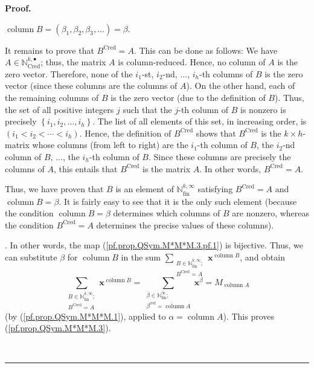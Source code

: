 \documentclass[numbers=enddot,12pt,final,onecolumn,notitlepage,abstracton]{scrartcl}%
\theoremstyle{definition}
\newenvironment{proof}[1][Proof]{\noindent\textbf{#1.} }{\ \rule{0.5em}{0.5em}}
\let\sumnonlimits\sum
\renewcommand{\sum}{\sumnonlimits\limits}
\begin{document}
\begin{proof}
{$\operatorname*{column}B=\left(  \beta_{1},\beta_{2},\beta_{3},\ldots\right)
=\beta$.
\par
It remains to prove that $B^{\operatorname*{Cred}}=A$. This can be done as
follows: We have $A\in\mathbb{N}_{\operatorname*{Cred}}^{k,\bullet}$; thus,
the matrix $A$ is column-reduced. Hence, no column of $A$ is the zero vector.
Therefore, none of the $i_{1}$-st, $i_{2}$-nd, $\ldots$, $i_{h}$-th columns of
$B$ is the zero vector (since these columns are the columns of $A$). On the
other hand, each of the remaining columns of $B$ is the zero vector (due to
the definition of $B$). Thus, the set of all positive integers $j$ such that
the $j$-th column of $B$ is nonzero is precisely $\left\{  i_{1},i_{2}%
,\ldots,i_{h}\right\}  $. The list of all elements of this set, in increasing
order, is $\left(  i_{1}<i_{2}<\cdots<i_{h}\right)  $. Hence, the definition
of $B^{\operatorname*{Cred}}$ shows that $B^{\operatorname*{Cred}}$ is the
$k\times h$-matrix whose columns (from left to right) are the $i_{1}$-th
column of $B$, the $i_{2}$-nd column of $B$, $\ldots$, the $i_{h}$-th column
of $B$. Since these columns are precisely the columns of $A$, this entails
that $B^{\operatorname*{Cred}}$ is the matrix $A$. In other words,
$B^{\operatorname*{Cred}}=A$.
\par
Thus, we have proven that $B$ is an element of $\mathbb{N}%
_{\operatorname*{fin}}^{k,\infty}$ satisfying $B^{\operatorname*{Cred}}=A$ and
$\operatorname*{column}B=\beta$. It is fairly easy to see that it is the only
such element (because the condition $\operatorname*{column}B=\beta$ determines
which columns of $B$ are nonzero, whereas the condition
$B^{\operatorname*{Cred}}=A$ determines the precise values of these
columns).}. In other words, the map (\ref{pf.prop.QSym.M*M*M.3.pf.1}) is
bijective. Thus, we can substitute $\beta$ for $\operatorname*{column}B$ in
the sum $\sum_{\substack{B\in\mathbb{N}_{\operatorname*{fin}}^{k,\infty
};\\B^{\operatorname*{Cred}}=A}}\mathbf{x}^{\operatorname*{column}B}$, and
obtain%
\[
\sum_{\substack{B\in\mathbb{N}_{\operatorname*{fin}}^{k,\infty}%
;\\B^{\operatorname*{Cred}}=A}}\mathbf{x}^{\operatorname*{column}B}%
=\sum_{\substack{\beta\in\mathbb{N}_{\operatorname*{fin}}^{\infty}%
;\\\beta^{\operatorname*{red}}=\operatorname*{column}A}}\mathbf{x}^{\beta
}=M_{\operatorname*{column}A}%
\]
(by (\ref{pf.prop.QSym.M*M*M.1}), applied to $\alpha=\operatorname*{column}%
A$). This proves (\ref{pf.prop.QSym.M*M*M.3}).


\end{proof}
\end{document}
